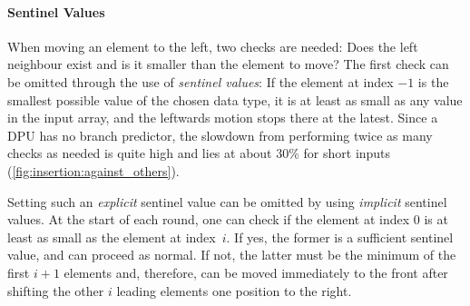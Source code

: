 \paragraph{Sentinel Values}
When moving an element to the left, two checks are needed:
Does the left neighbour exist and is it smaller than the element to move?
The first check can be omitted through the use of \emph{sentinel values}:
If the element at index \(-1\) is the smallest possible value of the chosen data type, it is at least as small as any value in the input array, and the leftwards motion stops there at the latest.
Since a DPU has no branch predictor, the slowdown from performing twice as many checks as needed is quite high and lies at about 30\% for short inputs (\cref{fig:insertion:against_others}).

Setting such an \emph{explicit} sentinel value can be omitted by using \emph{implicit} sentinel values.
At the start of each round, one can check if the element at index \(0\) is at least as small as the element at index~\(i\).
If yes, the former is a sufficient sentinel value, and \IS{} can proceed as normal.
If not, the latter must be the minimum of the first \(i + 1\) elements and, therefore, can be moved immediately to the front after shifting the other \(i\) leading elements one position to the right.




